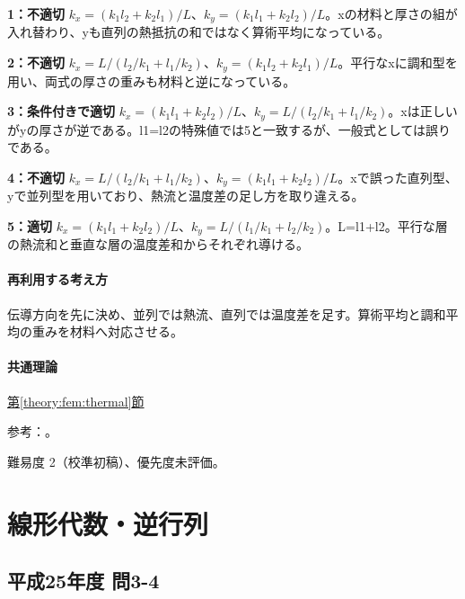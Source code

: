 \noindent\textbf{1：不適切} \(k_x=(k_1l_2+k_2l_1)/L\)、\(k_y=(k_1l_1+k_2l_2)/L\)。xの材料と厚さの組が入れ替わり、yも直列の熱抵抗の和ではなく算術平均になっている。\par

\noindent\textbf{2：不適切} \(k_x=L/(l_2/k_1+l_1/k_2)\)、\(k_y=(k_1l_2+k_2l_1)/L\)。平行なxに調和型を用い、両式の厚さの重みも材料と逆になっている。\par

\noindent\textbf{3：条件付きで適切} \(k_x=(k_1l_1+k_2l_2)/L\)、\(k_y=L/(l_2/k_1+l_1/k_2)\)。xは正しいがyの厚さが逆である。l1=\allowbreak{}l2の特殊値では5と一致するが、一般式としては誤りである。\par

\noindent\textbf{4：不適切} \(k_x=L/(l_2/k_1+l_1/k_2)\)、\(k_y=(k_1l_1+k_2l_2)/L\)。xで誤った直列型、yで並列型を用いており、熱流と温度差の足し方を取り違える。\par

\noindent\textbf{5：適切} \(k_x=(k_1l_1+k_2l_2)/L\)、\(k_y=L/(l_1/k_1+l_2/k_2)\)。L=\allowbreak{}l1+l2。平行な層の熱流和と垂直な層の温度差和からそれぞれ導ける。\par

\paragraph{再利用する考え方} 伝導方向を先に決め、並列では熱流、直列では温度差を足す。算術平均と調和平均の重みを材料へ対応させる。

\paragraph{共通理論} \hyperref[theory:fem:thermal]{第\ref*{theory:fem:thermal}節}

\par 参考：\cite{openstax_thermal_conduction}。

\par 難易度 2（校準初稿）、優先度未評価。

\section{線形代数・逆行列}

\subsection{平成25年度 問3-4}
\label{q:h25-reg-basic-3-4}

